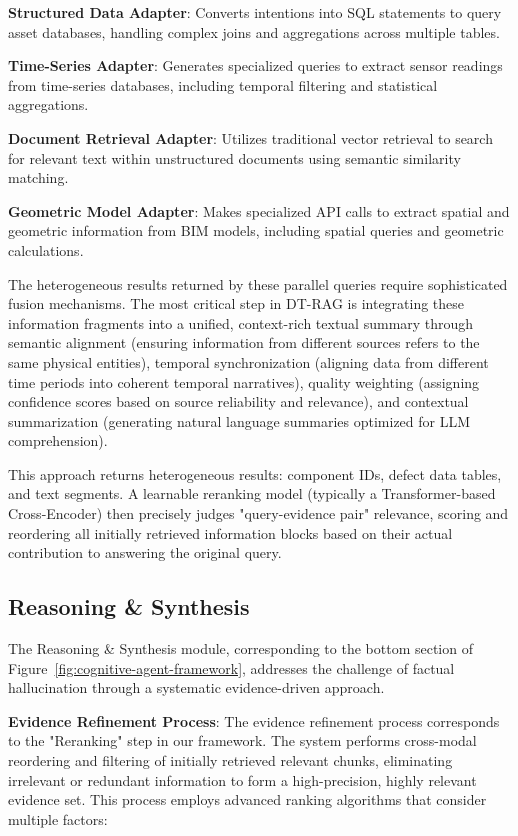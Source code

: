 \textbf{Structured Data Adapter}: Converts intentions into SQL statements to query asset databases, handling complex joins and aggregations across multiple tables.

\textbf{Time-Series Adapter}: Generates specialized queries to extract sensor readings from time-series databases, including temporal filtering and statistical aggregations.

\textbf{Document Retrieval Adapter}: Utilizes traditional vector retrieval to search for relevant text within unstructured documents using semantic similarity matching.

\textbf{Geometric Model Adapter}: Makes specialized API calls to extract spatial and geometric information from BIM models, including spatial queries and geometric calculations.

The heterogeneous results returned by these parallel queries require sophisticated fusion mechanisms. The most critical step in DT-RAG is integrating these information fragments into a unified, context-rich textual summary through semantic alignment (ensuring information from different sources refers to the same physical entities), temporal synchronization (aligning data from different time periods into coherent temporal narratives), quality weighting (assigning confidence scores based on source reliability and relevance), and contextual summarization (generating natural language summaries optimized for LLM comprehension).

This approach returns heterogeneous results: component IDs, defect data tables, and text segments. A learnable reranking model (typically a Transformer-based Cross-Encoder) then precisely judges "query-evidence pair" relevance, scoring and reordering all initially retrieved information blocks based on their actual contribution to answering the original query.

\subsection{Reasoning \& Synthesis}

The Reasoning \& Synthesis module, corresponding to the bottom section of Figure~\ref{fig:cognitive-agent-framework}, addresses the challenge of factual hallucination through a systematic evidence-driven approach.

\textbf{Evidence Refinement Process}: The evidence refinement process corresponds to the "Reranking" step in our framework. The system performs cross-modal reordering and filtering of initially retrieved relevant chunks, eliminating irrelevant or redundant information to form a high-precision, highly relevant evidence set. This process employs advanced ranking algorithms that consider multiple factors:

